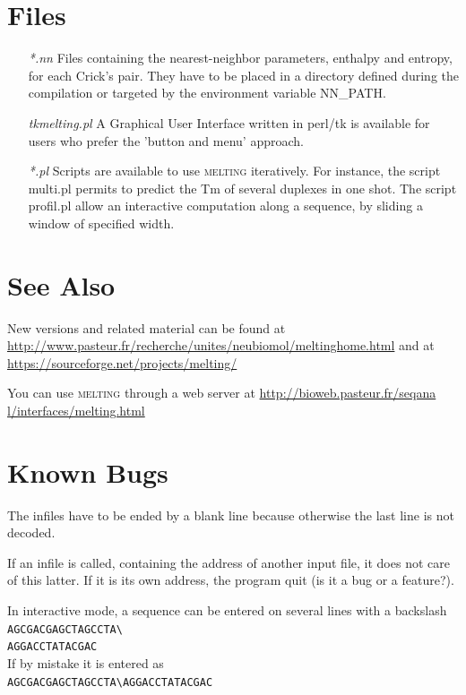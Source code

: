 \documentclass{article}
\begin{document}
\section{Files }
\begin{itemize}
\item [\textit{*.nn}] Files containing the nearest-neighbor parameters, enthalpy and entropy, 
for each Crick's pair.  They have to be placed in a directory defined during 
the compilation or targeted by the  environment variable NN\_PATH.  
\item [\textit{tkmelting.pl}] A Graphical User Interface written in perl/tk is available for users
who prefer  the 'button and menu' approach.  
\item [\textit{*.pl}] Scripts are available to 
use \textsc{melting} iteratively. For instance, the script multi.pl permits to predict 
the Tm of several duplexes in one shot. The script profil.pl allow
an interactive computation along a sequence, by sliding a window of specified width. 
  
\end{itemize}
 
\section{See Also }
New versions and 
related material can be found at \url{http://www.pasteur.fr/recherche/unites/neubiomol/meltinghome.html} 
and at \url{https://sourceforge.net/projects/melting/}
  
You can use \textsc{melting} through a web server at \url{http://bioweb.pasteur.fr/seqana
l/interfaces/melting.html}
  
\section{Known Bugs }
The infiles have to be ended by a blank line because otherwise the last line is not decoded.

If an infile is called, containing the 
address of another input file, it does not care of this latter.  If it 
is its own address, the program quit (is it a bug or a feature?).   
 
In interactive mode, a sequence can be entered on several lines with a backslash\\
\texttt{AGCGACGAGCTAGCCTA{\textbackslash}\\
AGGACCTATACGAC}\\
If by mistake it is entered as  \\
\texttt{AGCGACGAGCTAGCCTA{\textbackslash}{}AGGACCTATACGAC}
\end{document}

